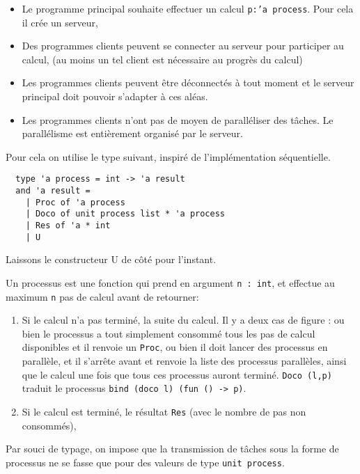 \documentclass[11pt]{article}
\begin{document}
\begin{itemize}
  \item Le programme principal souhaite effectuer un calcul
    {\tt p:'a process}. Pour cela il cr\'ee un serveur,
  \item Des programmes clients peuvent se connecter au serveur pour
    participer au calcul,
    (au moins un tel client est n\'ecessaire au progr\`es du calcul)
  \item Les programmes clients peuvent \^etre d\'econnect\'es \`a tout moment
    et le serveur principal doit pouvoir s'adapter \`a ces al\'eas.
  \item Les programmes clients n'ont pas de moyen de parall\'eliser
    des t\^aches. Le parall\'elisme est enti\`erement organis\'e
    par le serveur.
\end{itemize}

Pour cela on utilise le type suivant, inspir\'e de l'impl\'ementation
s\'equentielle.

\begin{lstlisting}
  type 'a process = int -> 'a result
  and 'a result =
    | Proc of 'a process
    | Doco of unit process list * 'a process
    | Res of 'a * int
    | U
\end{lstlisting}

Laissons le constructeur U de c\^ot\'e pour l'instant.

Un processus est une fonction qui prend en argument {\tt n : int},
et effectue au maximum {\tt n} pas de calcul avant de retourner:

\begin{enumerate}
  \item Si le calcul n'a pas termin\'e, la suite du calcul.
    Il y a deux cas de figure : ou bien le processus a tout simplement
    consomm\'e tous les pas de calcul disponibles
    et il renvoie un {\tt Proc},
    ou bien il doit lancer des processus en parall\`ele, et il s'arr\^ete
    avant et renvoie la liste des processus parall\`eles,
    ainsi que le calcul une fois que tous ces processus auront termin\'e.
    {\tt Doco (l,p)} traduit le processus
    {\tt bind (doco l) (fun () -> p)}.
  \item Si le calcul est termin\'e, le r\'esultat {\tt Res}
    (avec le nombre de pas non consomm\'es),
\end{enumerate}

Par souci de typage, on impose que la transmission de
t\^aches sous la forme de processus ne se fasse que pour des valeurs
de type {\tt unit process}.
\end{document}
